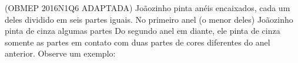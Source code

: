 \documentclass[preview]{standalone}
\begin{document}
\begin{center}
(OBMEP 2016N1Q6 ADAPTADA) Joãozinho pinta anéis encaixados, 
cada um deles dividido em seis partes iguais.
No primeiro anel (o menor deles) Joãozinho pinta de cinza algumas partes
Do segundo anel em diante, ele pinta de cinza somente
as partes em contato com duas partes de cores diferentes do anel anterior.
Observe um exemplo:
\end{center}
\end{document}
